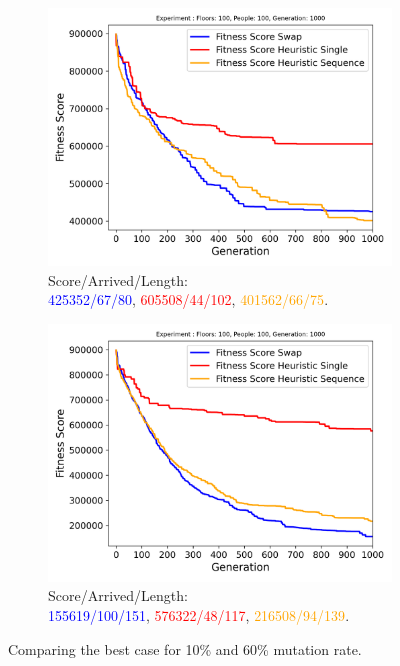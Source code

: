 \begin{figure}[ht]
	\centering
	\begin{subfigure}[b]{0.49\linewidth}
		\centering
		\includegraphics[width=\linewidth]{results/Building_Large/Mutation_0.1/Floors__100,_People__100,_Generation__1000_2_best.png}
		\captionsetup{justification=centering,font=tiny}
		\caption{Score/Arrived/Length:\\\textcolor{blue}{425352/67/80}, \textcolor{red}{605508/44/102}, \textcolor{orange}{401562/66/75}.}
		\label{fig:Building Large 0.1 best}
	\end{subfigure}
	\hfill
	\begin{subfigure}[b]{0.49\linewidth}
		\centering
		\includegraphics[width=\linewidth]{results/Building_Large/Mutation_0.6/Floors__100,_People__100,_Generation__1000_best.png}
		\captionsetup{justification=centering,font=tiny}
		\caption{Score/Arrived/Length:\\\textcolor{blue}{155619/100/151}, \textcolor{red}{576322/48/117}, \textcolor{orange}{216508/94/139}.}
		\label{fig:Building Large 0.6 best}
	\end{subfigure}
	\captionsetup{font=scriptsize}
	\caption{Comparing the best case for 10\% and 60\% mutation rate.}
	\label{fig:Building Large results}
\end{figure}

